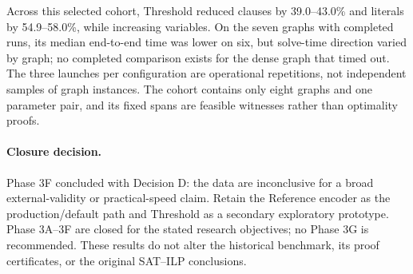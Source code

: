 Across this selected cohort, Threshold reduced clauses by 39.0--43.0\%
and literals by 54.9--58.0\%, while increasing variables. On the seven
graphs with completed runs, its median end-to-end time was lower on six,
but solve-time direction varied by graph; no completed comparison exists
for the dense graph that timed out. The three launches per configuration
are operational repetitions, not independent samples of graph instances.
The cohort contains only eight graphs and one parameter pair, and its
fixed spans are feasible witnesses rather than optimality proofs.

\paragraph{Closure decision.}
Phase 3F concluded with Decision D: the data are inconclusive for a broad
external-validity or practical-speed claim. Retain the Reference encoder
as the production/default path and Threshold as a secondary exploratory
prototype. Phase 3A--3F are closed for the stated research objectives;
no Phase 3G is recommended. These results do not alter the historical
benchmark, its proof certificates, or the original SAT--ILP conclusions.
